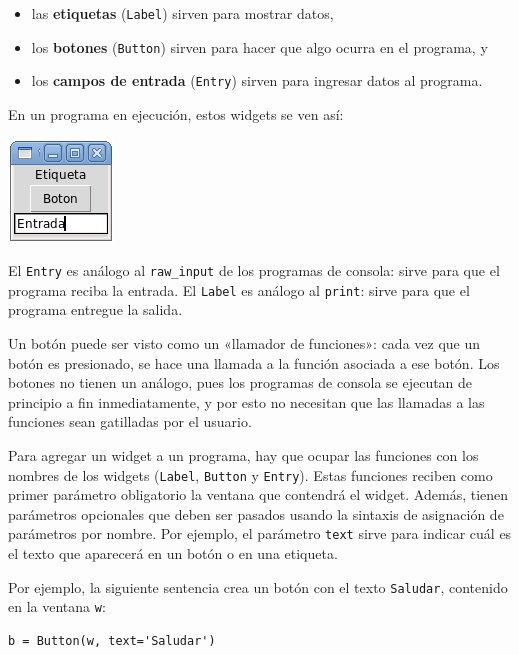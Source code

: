 \begin{itemize}
\item
  las \textbf{etiquetas} (\lstinline!Label!) sirven para mostrar datos,
\item
  los \textbf{botones} (\lstinline!Button!) sirven para hacer que algo
  ocurra en el programa, y
\item
  los \textbf{campos de entrada} (\lstinline!Entry!) sirven para
  ingresar datos al programa.
\end{itemize}

En un programa en ejecución, estos widgets se ven así:

\includegraphics{../diapos/programas/tkinter/capturas/widgets.png}

El \lstinline!Entry! es análogo al \lstinline!raw_input! de los
programas de consola: sirve para que el programa reciba la entrada. El
\lstinline!Label! es análogo al \lstinline!print!: sirve para que el
programa entregue la salida.

Un botón puede ser visto como un «llamador de funciones»: cada vez que
un botón es presionado, se hace una llamada a la función asociada a ese
botón. Los botones no tienen un análogo, pues los programas de consola
se ejecutan de principio a fin inmediatamente, y por esto no necesitan
que las llamadas a las funciones sean gatilladas por el usuario.

Para agregar un widget a un programa, hay que ocupar las funciones con
los nombres de los widgets (\lstinline!Label!, \lstinline!Button! y
\lstinline!Entry!). Estas funciones reciben como primer parámetro
obligatorio la ventana que contendrá el widget. Además, tienen
parámetros opcionales que deben ser pasados usando la sintaxis de
asignación de parámetros por nombre. Por ejemplo, el parámetro
\lstinline!text! sirve para indicar cuál es el texto que aparecerá en un
botón o en una etiqueta.

Por ejemplo, la siguiente sentencia crea un botón con el texto
\lstinline!Saludar!, contenido en la ventana \lstinline!w!:

\begin{lstlisting}
b = Button(w, text='Saludar')
\end{lstlisting}

